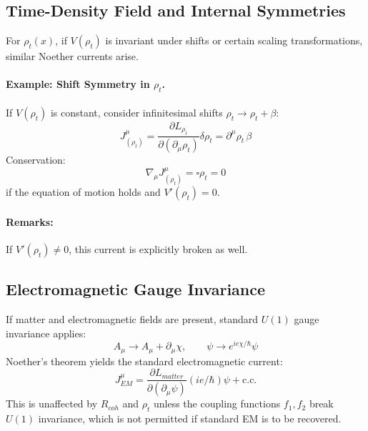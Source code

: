 \documentclass[american,11pt,letterpaper]{article}
\def\mathcal#1{#1}%
\def\mathrm#1{#1}%
\begin{document}
\subsection{Time-Density Field and Internal Symmetries}

For $\rho_t(x)$, if $V(\rho_t)$ is invariant under shifts or certain scaling transformations, similar Noether currents arise.

\paragraph{Example: Shift Symmetry in $\rho_t$.}
If $V(\rho_t)$ is constant, consider infinitesimal shifts $\rho_t \to \rho_t + \beta$:
\[
J^\mu_{(\rho_t)} = \frac{\partial \mathcal{L}_{\rho_t}}{\partial (\partial_\mu \rho_t)} \delta \rho_t = \partial^\mu \rho_t\, \beta
\]
Conservation:
\[
\nabla_\mu J^\mu_{(\rho_t)} = \square \rho_t = 0
\]
if the equation of motion holds and $V'(\rho_t) = 0$.

\paragraph{Remarks:}
If $V'(\rho_t) \neq 0$, this current is explicitly broken as well.

\subsection{Electromagnetic Gauge Invariance}

If matter and electromagnetic fields are present, standard $U(1)$ gauge invariance applies:
\[
A_\mu \to A_\mu + \partial_\mu \chi, \qquad \psi \to e^{ie\chi/\hbar} \psi
\]
Noether's theorem yields the standard electromagnetic current:
\[
J^\mu_{\mathrm{EM}} = \frac{\partial \mathcal{L}_{\mathrm{matter}}}{\partial (\partial_\mu \psi)} (i e / \hbar) \psi + \text{c.c.}
\]
This is unaffected by $R_{\mathrm{coh}}$ and $\rho_t$ unless the coupling functions $f_1, f_2$ break $U(1)$ invariance, which is not permitted if standard EM is to be recovered.
\end{document}
